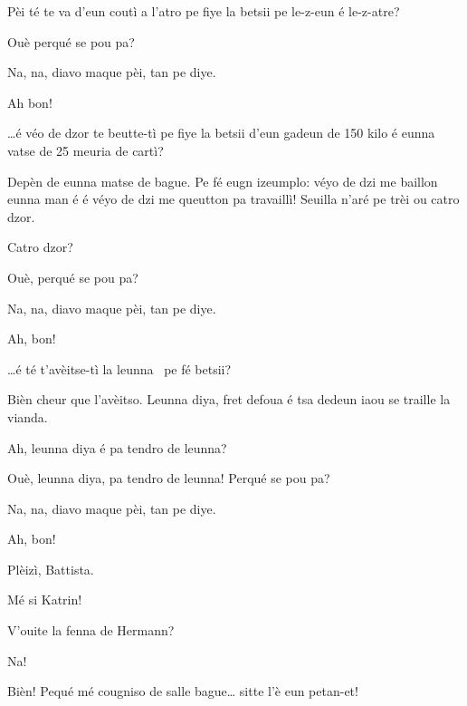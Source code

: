 \begin{drama}

\Battistaspeaks  {} Pèi té te va d’eun coutì a l’atro pe fiye la betsii pe le-z-eun é le-z-atre?

\Hermannspeaks {} Ouè perqué se pou pa?

\Battistaspeaks{}  Na, na, diavo maque pèi, tan pe diye.

\Hermannspeaks Ah bon!

\Battistaspeaks  {} \ldots é véo de dzor te beutte-tì pe fiye la betsii d’eun gadeun de 150 kilo é eunna vatse de 25 meuria de cartì?

\Hermannspeaks Depèn de eunna matse de bague. Pe fé eugn izeumplo: véyo de dzi me baillon eunna man é  é véyo de dzi me queutton pa travaillì! Seuilla n'aré pe trèi ou catro dzor.

\Battistaspeaks  Catro dzor?

\Hermannspeaks{} Ouè, perqué se pou pa?

\Battistaspeaks{}  Na, na, diavo maque pèi, tan pe diye.

\Hermannspeaks Ah, bon!

\Battistaspeaks{}\ldots é té t’avèitse-tì la leunna \luna\ pe fé betsii?

\Hermannspeaks Bièn cheur que l’avèitso. Leunna diya, fret defoua é tsa dedeun iaou se traille la vianda. 

\Battistaspeaks Ah, leunna diya é pa tendro de leunna?

\Hermannspeaks {} Ouè, leunna diya, pa tendro de leunna! Perqué se pou pa?

\Battistaspeaks{}  Na, na, diavo maque pèi, tan pe diye.

\Hermannspeaks Ah, bon!


\Battistaspeaks{} Plèizì, Battista.

\Katrinspeaks{} Mé si Katrin!

\Battistaspeaks  V'ouite la fenna de Hermann?

\Katrinspeaks  Na!

\Battistaspeaks  Bièn! Pequé mé cougniso de salle bague\ldots {} sitte l’è eun petan-et!


\end{drama}
